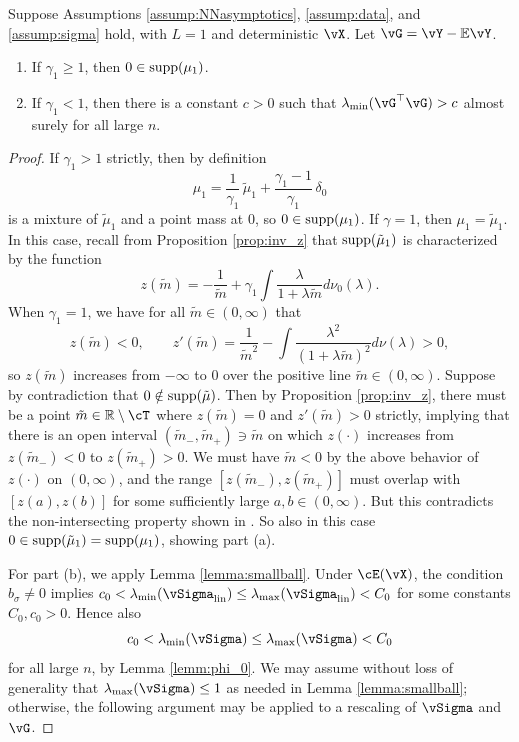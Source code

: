 \begin{lemma}\label{lemma:outliersat0}
Suppose Assumptions \ref{assump:NNasymptotics}, \ref{assump:data}, and
\ref{assump:sigma} hold, with $L=1$ and deterministic $\vX$. Let
$\vG=\vY-\E\vY$.
\begin{enumerate}[label=(\alph*)]
\item If $\gamma_1 \geq 1$, then $0 \in \mathrm{supp}({\mu_1})$.
\item If $\gamma_1<1$, then there is a constant $c>0$ such that
$\lambda_{\min}(\vG^\top \vG)>c$ almost surely for all large $n$.
\end{enumerate}
\end{lemma}
\begin{proof}
If $\gamma_1>1$ strictly, then by definition
\[\mu_1=\frac{1}{\gamma_1}\,\tilde \mu_1+\frac{\gamma_1-1}{\gamma_1}\,\delta_0\]
is a mixture of $\tilde \mu_1$ and a point mass at 0, so $0 \in \mathrm{supp}({\mu_1})$.
If $\gamma=1$, then $\mu_1=\tilde \mu_1$. In this case,
recall from Proposition \ref{prop:inv_z}
that $\mathrm{supp}({\tilde \mu_1})$ is characterized by the function
\[z(\tilde m)={-}\frac{1}{\tilde m}+\gamma_1
\int \frac{\lambda}{1+\lambda \tilde m}d\nu_0(\lambda).\]
When $\gamma_1=1$, we have for all $\tilde m \in (0,\infty)$ that
\[z(\tilde m)<0, \qquad
z'(\tilde m)=\frac{1}{\tilde m^2}-\int \frac{\lambda^2}{(1+\lambda \tilde m)^2}
d\nu(\lambda)>0,\]
so $z(\tilde m)$ increases from $-\infty$ to 0 over the positive line
$\tilde m \in (0,\infty)$. Suppose by contradiction that
$0 \notin \mathrm{supp}({\tilde \mu})$. Then by
Proposition \ref{prop:inv_z}, there must be a point $\tilde m \in \R \setminus
\cT$ where $z(\tilde m)=0$ and $z'(\tilde m)>0$ strictly, implying that
there is an open interval $(\tilde m_-,\tilde m_+) \ni \tilde m$
on which $z(\cdot)$ increases from $z(\tilde m_-)<0$ to $z(\tilde m_+)>0$.
We must have $\tilde m<0$ by the above behavior of $z(\cdot)$ on
$(0,\infty)$, and the range $[z(\tilde m_-),z(\tilde m_+)]$ must overlap with
$[z(a),z(b)]$ for some sufficiently large $a,b \in (0,\infty)$.
But this contradicts the non-intersecting property
shown in \cite[Theorem 4.4]{silverstein1995analysis}. So
also in this case $0 \in \mathrm{supp}({\tilde \mu_1})=\mathrm{supp}({\mu_1})$, showing part (a).

For part (b), we apply Lemma \ref{lemma:smallball}. Under $\cE(\vX)$,
the condition $b_\sigma \neq 0$ implies
$c_0<\lambda_{\min}(\vSigma_{\mathrm{lin}}) \leq
\lambda_{\max}(\vSigma_{\mathrm{lin}})<C_0$ for some constants $C_0,c_0>0$.
Hence also
\begin{equation}\label{eq:Sigmabounds}
c_0<\lambda_{\min}(\vSigma) \leq \lambda_{\max}(\vSigma)<C_0
\end{equation}
for all large $n$, by Lemma \ref{lemm:phi_0}.
We may assume without loss of generality that
$\lambda_{\max}(\vSigma) \leq 1$ as needed in Lemma \ref{lemma:smallball};
otherwise, the following argument may be applied to a rescaling of $\vSigma$
and $\vG$.


\end{proof}
